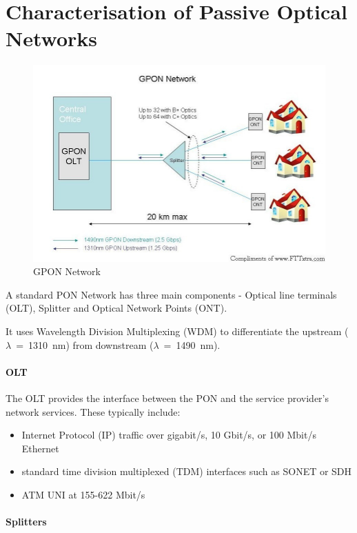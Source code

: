 \section{Characterisation of Passive Optical Networks}

\begin{figure}%
\includegraphics[width=\columnwidth]{grafiken/gpon.jpg}%
\caption{GPON Network}%
\label{}%
\end{figure}

A standard PON Network has three main components - Optical line terminals (OLT), Splitter and Optical Network Points (ONT).

It uses Wavelength Division Multiplexing (WDM) to differentiate the upstream ($\lambda$~=~1310~nm) from downstream ($\lambda~=~$1490~nm).

\paragraph{OLT}
The OLT provides the interface between the PON and the service provider's network services. These typically include:

\begin{itemize}
	\item Internet Protocol (IP) traffic over gigabit/s, 10 Gbit/s, or 100 Mbit/s Ethernet
\item standard time division multiplexed (TDM) interfaces such as SONET or SDH
\item ATM UNI at 155-622 Mbit/s
\end{itemize}

\paragraph{Splitters}

